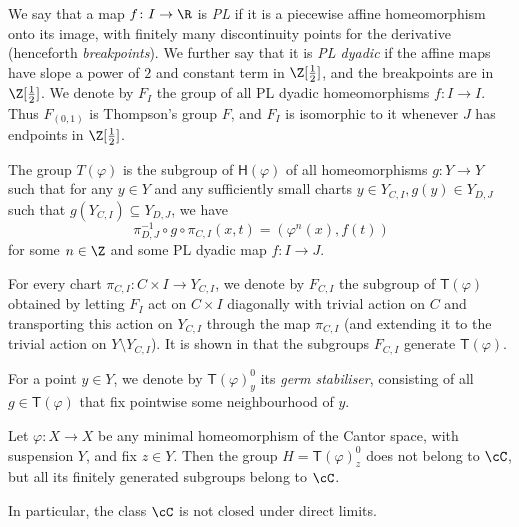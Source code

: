 \documentclass[reqno]{amsart}
\newcommand{\Hphi}{\mathsf{H}(\varphi)}
\newcommand{\Tphi}{\mathsf{T}(\varphi)}
\begin{document}
We say that a map $f\colon I\to \R$  is \emph{PL} if it is a {piecewise affine} homeomorphism onto its image, with finitely many discontinuity points for the derivative (henceforth \emph{breakpoints}). We further say that it is \emph{PL dyadic} if the affine maps have slope a power of $2$ and constant term in $\Z[\frac{1}{2}]$, and the breakpoints are in $\Z[\frac{1}{2}]$. We denote by $F_I$ the group of all PL dyadic homeomorphisms $f\colon I\to I$. Thus $F_{(0, 1)}$ is Thompson's group $F$, and $F_I$ is isomorphic to it whenever $J$ has endpoints in $\Z[\frac{1}{2}]$.
\begin{defn}

The group $T(\varphi)$ is the subgroup of $\Hphi$ of all homeomorphisms $g\colon Y\to Y$ such that for any $y\in Y$ and any sufficiently small charts $y\in Y_{C, I}, g(y)\in Y_{D, J}$ such that $g(Y_{C, I})\subseteq Y_{D, J}$, we have
\[\ \pi_{D, J}^{-1} \circ g\circ\pi_{C, I}(x, t)=(\varphi^n(x), f(t))\]
for some $n\in \Z$ and some PL dyadic map $f\colon I\to J$. 
\end{defn}
For every chart $\pi_{C, I}\colon C\times I\to Y_{C, I}$, we denote by $F_{C, I}$ the subgroup of $\Tphi$ obtained by letting $F_I$ act on $C\times I$ diagonally with trivial action on $C$ and transporting this action on $Y_{C, I}$ through the map $\pi_{C, I}$ (and extending it to the trivial action on $Y\setminus Y_{C, I}$). It is shown in \cite[Proposition 4.4]{MatteBonTriestino2020} that the subgroups $F_{C, I}$ generate $\Tphi$.


For a point $y\in Y$, we denote by $\Tphi^0_y$ its \emph{germ stabiliser}, consisting of all $g\in \Tphi$ that  fix pointwise some neighbourhood of $y$.

\begin{prop} \label{prop:nolimites}
Let $\varphi\colon X\to X$ be any minimal homeomorphism of the Cantor space, with suspension $Y$, and fix $z\in Y$. Then the group $H=\Tphi^0_z$ does not belong to $\cC$, but all its finitely generated subgroups belong to $\cC$.

In particular, the class $\cC$ is not closed under direct limits. 
\end{prop}
\end{document}
